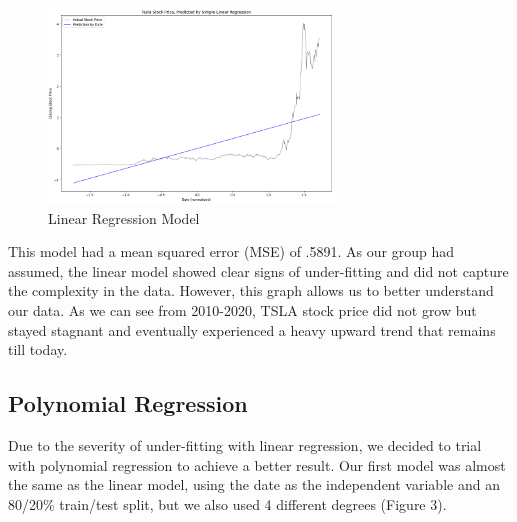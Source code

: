 \documentclass[12pt,a4paper]{article}
\begin{document}
\begin{figure}[h]
\caption{Linear Regression Model}
\centering
\includegraphics[width=3in]{./Figures/LinearRegression.png}
\end{figure}

This model had a mean squared error (MSE) of .5891. As our group had assumed, the linear model showed clear signs of under-fitting and did not capture the complexity in the data. However, this graph allows us to better understand our data. As we can see from 2010-2020, TSLA stock price did not grow but stayed stagnant and eventually experienced a heavy upward trend that remains till today.


\subsection{Polynomial Regression}
Due to the severity of under-fitting with linear regression, we decided to trial with polynomial regression to achieve a better result. Our first model was almost the same as the linear model, using the date as the independent variable and an 80/20\% train/test split, but we also used 4 different degrees (Figure 3). 
\end{document}

